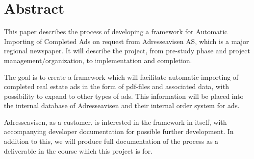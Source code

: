 \section{Abstract}

This paper describes the process of developing a framework for Automatic Importing of Completed Ads on request from Adresseavisen AS, which is a major regional newspaper. It will describe the project, from pre-study phase and project management/organization, to implementation and completion.

The goal is to create a framework which will facilitate automatic importing of completed real estate ads in the form of pdf-files and associated data, with possibility to expand to other types of ads. This information will be placed into the internal database of Adresseavisen and their internal order system for ads.

Adresseavisen, as a customer, is interested in the framework in itself, with accompanying developer documentation for possible further development. In addition to this, we will produce full documentation of the process as a deliverable in the course which this project is for.
